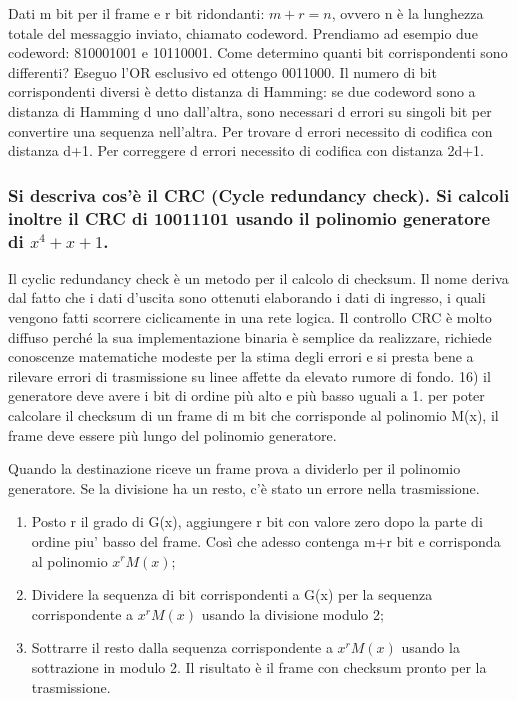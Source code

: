 Dati m bit per il frame e r bit ridondanti: $m+r=n$, ovvero n è la lunghezza totale del messaggio
inviato, chiamato codeword. Prendiamo ad esempio due codeword: 810001001 e 10110001. Come determino quanti bit corrispondenti sono differenti? Eseguo l’OR esclusivo ed ottengo 0011000. Il numero di bit corrispondenti diversi è detto distanza di Hamming: se due codeword sono a distanza di Hamming d uno dall’altra, sono necessari d errori su singoli bit per convertire una sequenza nell’altra. Per trovare d errori necessito di codifica con distanza d+1. 
Per correggere d errori necessito di codifica con distanza 2d+1.

\subsubsection{Si descriva cos'è il CRC (Cycle redundancy check). Si calcoli inoltre il CRC di 10011101 usando il polinomio generatore di $x^4+x+1$.}

Il cyclic redundancy check è un metodo per il calcolo di checksum. Il nome deriva dal fatto che i dati d'uscita sono ottenuti elaborando i dati di ingresso, i quali vengono fatti scorrere ciclicamente in una rete logica. Il controllo CRC è molto diffuso perché la sua implementazione binaria è semplice da realizzare, richiede conoscenze matematiche modeste per la stima degli errori e si presta bene a rilevare errori di trasmissione su linee affette da elevato rumore di fondo. 16) il generatore deve avere i bit di ordine più alto e più basso uguali a 1. per poter calcolare il checksum di un frame di m bit che corrisponde al polinomio M(x), il frame deve essere più lungo del polinomio generatore.

Quando la destinazione riceve un frame prova a dividerlo per il polinomio generatore. Se la
divisione ha un resto, c'è stato un errore nella trasmissione.

\begin{enumerate}

\item Posto r il grado di G(x), aggiungere r bit con valore zero dopo la parte di ordine piu'
basso del frame. Così che adesso contenga m+r bit e corrisponda al polinomio $x^r M(x)$;
\item Dividere la sequenza di bit corrispondenti a G(x) per la sequenza corrispondente a $x^r
M(x)$ usando la divisione modulo 2;
\item Sottrarre il resto dalla sequenza corrispondente a $x^r M(x)$ usando la sottrazione in
modulo 2. Il risultato è il frame con checksum pronto per la trasmissione.

\end{enumerate}

